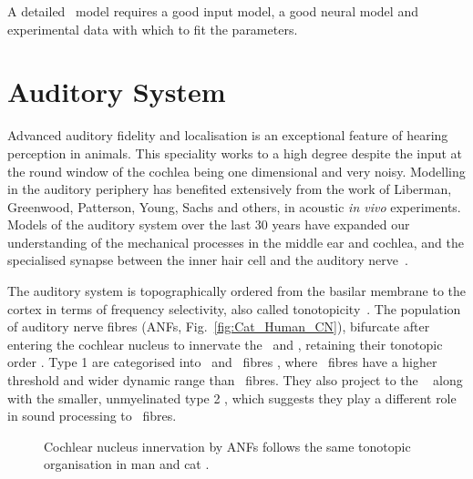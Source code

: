 
A detailed \BNN~model requires a good input model, a good neural model and experimental data with which to fit the parameters.

\section{Auditory System    \label{sec:CN:auditory-model}}

Advanced auditory fidelity and localisation is an exceptional feature of hearing perception in animals.
This speciality works to a high degree despite the input at the round window of the cochlea being one dimensional and very noisy.
Modelling in the auditory periphery has benefited extensively from the work of Liberman, Greenwood, Patterson, Young, Sachs and others, in acoustic \textit{in vivo} experiments.
Models of the auditory system over the last 30 years have expanded our understanding of the mechanical processes in the middle ear and cochlea, and the specialised synapse between the inner hair cell and the auditory nerve~\citep{DavisVoigt:1991,Carney:1993,MeddisHewittEtAl:1990}.


The auditory system is topographically ordered from the basilar membrane to the cortex in terms of frequency selectivity, also called tonotopicity~\citep{YoungOertel:2004}.
The population of auditory nerve fibres (ANFs, Fig.~\ref{fig:Cat_Human_CN}), bifurcate after entering the cochlear nucleus to innervate the \VCN~and \DCN, retaining their tonotopic order \citep{Lorente:1981,Liberman:1982,Liberman:1993}.
Type 1 \ANFs are categorised into {\HSR}~and {\LSR}~fibres \citep{Liberman:1978}, where \LSR~fibres have a higher threshold and wider dynamic range than \HSR~fibres.
They also project to the \GCD~\citep{RyugoParks:2003, RyugoHaenggeliEtAl:2003} along with the smaller, unmyelinated type 2 \ANFs, which suggests they play a different role in sound processing to \HSR~fibres.


\begin{figure}[htb]
  \begin{center}
    \caption[Tonotopic innervation by ANFs in the CN of man and cat.]{Cochlear nucleus innervation by ANFs follows the same tonotopic organisation in man and cat
\citep[!find out which publication printed this!]{RyugoParks:2003,Ryugo:1992,Spoendlin:1973}.}
    \label{fig:CN_Cat_Human}
  \end{center}
\end{figure}


